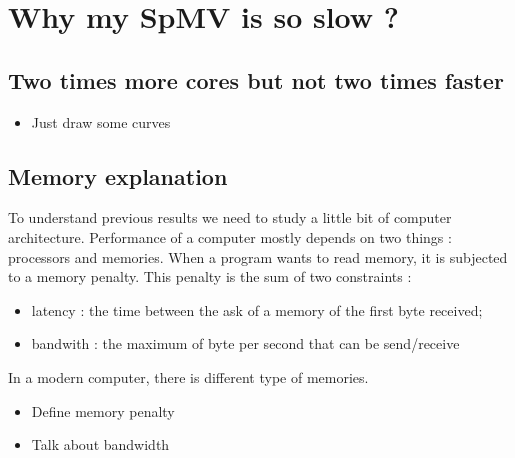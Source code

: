 \section{Why my SpMV is so slow ?}
\subsection{Two times more cores but not two times faster}
  \begin{itemize}
    \item Just draw some curves
  \end{itemize}
\subsection{Memory explanation}
To understand previous results we need to study a little bit of computer architecture.
%
Performance of a computer mostly depends on two things : processors and memories.
%
When a program wants to read memory, it is subjected to a memory penalty.
%
This penalty is the sum of two constraints :
\begin{itemize}
        \item latency : the time between the ask of a memory of the first byte received;
        \item bandwith : the maximum of byte per second that can be send/receive
\end{itemize}
%
In a modern computer, there is different type of memories.
%




  \begin{itemize}
    \item Define memory penalty
    \item Talk about bandwidth
  \end{itemize}
